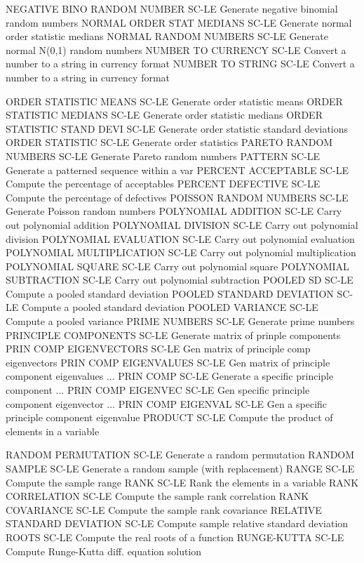 NEGATIVE BINO RANDOM NUMBER SC-LE Generate negative binomial random numbers
NORMAL ORDER STAT MEDIANS   SC-LE Generate normal order statistic medians
NORMAL RANDOM NUMBERS       SC-LE Generate normal N(0,1) random numbers
NUMBER TO CURRENCY          SC-LE Convert a number to a string in currency format
NUMBER TO STRING            SC-LE Convert a number to a string in currency format

ORDER STATISTIC MEANS       SC-LE Generate order statistic means
ORDER STATISTIC MEDIANS     SC-LE Generate order statistic medians
ORDER STATISTIC STAND DEVI  SC-LE Generate order statistic standard deviations
ORDER STATISTIC             SC-LE Generate order statistics
PARETO RANDOM NUMBERS       SC-LE Generate Pareto random numbers
PATTERN                     SC-LE Generate a patterned sequence within a var
PERCENT ACCEPTABLE          SC-LE Compute the percentage of acceptables
PERCENT DEFECTIVE           SC-LE Compute the percentage of defectives
POISSON RANDOM NUMBERS      SC-LE Generate Poisson random numbers
POLYNOMIAL ADDITION         SC-LE Carry out polynomial addition
POLYNOMIAL DIVISION         SC-LE Carry out polynomial division
POLYNOMIAL EVALUATION       SC-LE Carry out polynomial evaluation
POLYNOMIAL MULTIPLICATION   SC-LE Carry out polynomial multiplication
POLYNOMIAL SQUARE           SC-LE Carry out polynomial square
POLYNOMIAL SUBTRACTION      SC-LE Carry out polynomial subtraction
POOLED SD                   SC-LE Compute a pooled standard deviation
POOLED STANDARD DEVIATION   SC-LE Compute a pooled standard deviation
POOLED VARIANCE             SC-LE Compute a pooled variance
PRIME NUMBERS               SC-LE Generate prime numbers
PRINCIPLE COMPONENTS        SC-LE Generate matrix of prinple components
PRIN COMP EIGENVECTORS      SC-LE Gen matrix of principle comp eigenvectors
PRIN COMP EIGENVALUES       SC-LE Gen matrix of principle component eigenvalues
... PRIN COMP               SC-LE Generate a specific principle component
... PRIN COMP EIGENVEC      SC-LE Gen specific principle component eigenvector
... PRIN COMP EIGENVAL      SC-LE Gen a specific principle component eigenvalue
PRODUCT                     SC-LE Compute the product of elements in a variable

RANDOM PERMUTATION          SC-LE Generate a random permutation
RANDOM SAMPLE               SC-LE Generate a random sample (with replacement)
RANGE                       SC-LE Compute the sample range
RANK                        SC-LE Rank the elements in a variable
RANK CORRELATION            SC-LE Compute the sample rank correlation
RANK COVARIANCE             SC-LE Compute the sample rank covariance
RELATIVE STANDARD DEVIATION SC-LE Compute sample relative standard deviation
ROOTS                       SC-LE Compute the real roots of a function
RUNGE-KUTTA                 SC-LE Compute Runge-Kutta diff. equation solution

